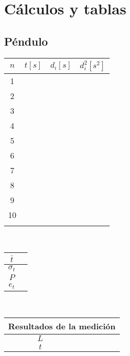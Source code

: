 \documentclass[letter,11pt]{article}
\begin{document}
\section{Cálculos y tablas}

\subsection{Péndulo}
\begin{tabular}{|c|>{\centering}m{2.0cm}<{\centering}
                  |>{\centering}m{2.0cm}<{\centering}
                  |>{\centering}m{2.0cm}<{\centering}|}
\hline
\textbf{$n$} & \textbf{$t[s]$}
             & \textbf{$d_i[s]$}
             & \textbf{$d_i^2[s^2]$} \tabularnewline \hline
1 & & & \\ \hline
2 & & & \\ \hline
3 & & & \\ \hline
4 & & & \\ \hline
5 & & & \\ \hline
6 & & & \\ \hline
7 & & & \\ \hline
8 & & & \\ \hline
9 & & & \\ \hline
10 & & & \\ \hline
 & & & \\ \hline
\end{tabular}\\

\vspace{1.4cm}
\begin{tabular}{|c|p{2.0cm}|}
\hline
$\bar{t}$ & \\ \hline
$\sigma_t$ & \\ \hline
$P$ & \\ \hline
$e_t$ & \\ \hline
\end{tabular}\\

\vspace{1.4cm}
\begin{tabular}{|c|p{2.0cm}|}
\hline
\multicolumn{2}{|c|}{Resultados de la medición} \\ \hline
$L$ & \\ \hline
$t$ & \\ \hline
\end{tabular}
\end{document}
